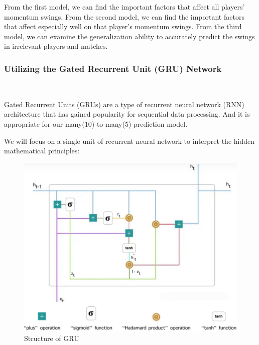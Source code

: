 From the first model, we can find the important factors that affect all players' momentum swings.
From the second model, we can find the important factors that affect 
especially well on that player's momentum swings.
From the third model, we can examine
the generalization ability to accurately predict the swings in irrelevant players and matches.

\subsubsection{Utilizing the Gated Recurrent Unit (GRU) Network}~{}

Gated Recurrent Units (GRUs) are a type of recurrent neural network (RNN) 
architecture that has gained popularity for sequential data processing. 
And it is appropriate for our many(10)-to-many(5) prediction model.

We will focus on a single unit of recurrent neural network to interpret the hidden mathematical principles:
\begin{figure}[H]
    \centering
    \includegraphics[scale=0.15]{mainmatter/imgs/6.jpg}
    \caption{Structure of GRU}
\end{figure}

